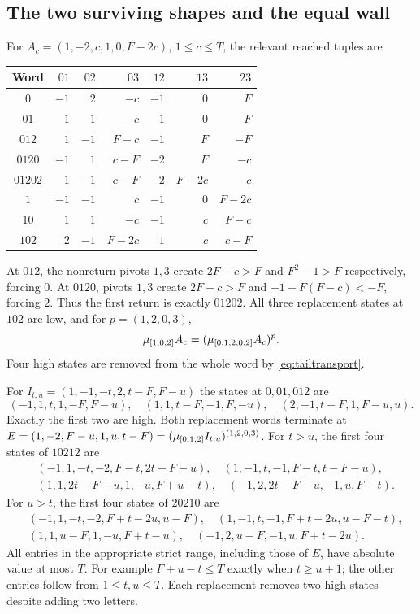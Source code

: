 \subsection{The two surviving shapes and the equal wall}\label{app:equal}
For $A_c=(1,-2,c,1,0,F-2c)$, $1\le c\le T$, the relevant reached tuples are
\begin{center}\small\begin{tabular}{c|rrrrrr}\toprule
Word & $01$&$02$&$03$&$12$&$13$&$23$\\\midrule
$0$&$-1$&$2$&$-c$&$-1$&$0$&$F$\\
$01$&$1$&$1$&$-c$&$1$&$0$&$F$\\
$012$&$1$&$-1$&$F-c$&$-1$&$F$&$-F$\\
$0120$&$-1$&$1$&$c-F$&$-2$&$F$&$-c$\\
$01202$&$1$&$-1$&$c-F$&$2$&$F-2c$&$c$\\\midrule
$1$&$-1$&$-1$&$c$&$-1$&$0$&$F-2c$\\
$10$&$1$&$1$&$-c$&$-1$&$c$&$F-c$\\
$102$&$2$&$-1$&$F-2c$&$1$&$c$&$c-F$\\\bottomrule
\end{tabular}\end{center}
At $012$, the nonreturn pivots $1,3$ create $2F-c>F$ and $F^2-1>F$ respectively, forcing $0$. At $0120$, pivots $1,3$ create $2F-c>F$ and $-1-F(F-c)<-F$, forcing $2$. Thus the first return is exactly $01202$. All three replacement states at $102$ are low, and for $p=(1,2,0,3)$,
\[
 \mu_{[1,0,2]}A_c=(\mu_{[0,1,2,0,2]}A_c)^p.
\]
Four high states are removed from the whole word by \eqref{eq:tailtransport}.

For $I_{t,u}=(1,-1,-t,2,t-F,F-u)$ the states at $0,01,012$ are
\[
 (-1,1,t,1,-F,F-u),\quad(1,1,t-F,-1,F,-u),\quad(2,-1,t-F,1,F-u,u).
\]
Exactly the first two are high. Both replacement words terminate at
$E=(1,-2,F-u,1,u,t-F)=(\mu_{[0,1,2]}I_{t,u})^{(1,2,0,3)}$.
For $t>u$, the first four states of $10212$ are
\begin{align*}
 &(-1,1,-t,-2,F-t,2t-F-u),\quad(1,-1,t,-1,F-t,t-F-u),\\
 &(1,1,2t-F-u,1,-u,F+u-t),\quad(-1,2,2t-F-u,-1,u,F-t).
\end{align*}
For $u>t$, the first four states of $20210$ are
\begin{align*}
 &(-1,1,-t,-2,F+t-2u,u-F),\quad(1,-1,t,-1,F+t-2u,u-F-t),\\
 &(1,1,u-F,1,-u,F+t-u),\quad(-1,2,u-F,-1,u,F+t-2u).
\end{align*}
All entries in the appropriate strict range, including those of $E$, have absolute value at most $T$. For example $F+u-t\le T$ exactly when $t\ge u+1$; the other entries follow from $1\le t,u\le T$. Each replacement removes two high states despite adding two letters.

